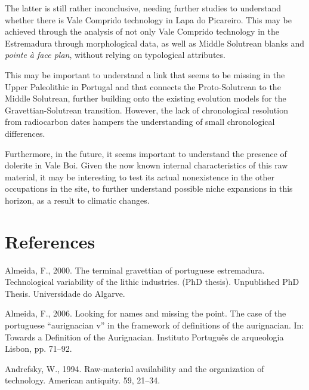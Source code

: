\documentclass[12pt,twoside]{reedthesis}
\begin{document}
The latter is still rather inconclusive, needing further studies to understand whether there is Vale Comprido technology in Lapa do Picareiro. This may be achieved through the analysis of not only Vale Comprido technology in the Estremadura through morphological data, as well as Middle Solutrean blanks and \emph{pointe à face plan}, without relying on typological attributes.

This may be important to understand a link that seems to be missing in the Upper Paleolithic in Portugal and that connects the Proto-Solutrean to the Middle Solutrean, further building onto the existing evolution models for the Gravettian-Solutrean transition. However, the lack of chronological resolution from radiocarbon dates hampers the understanding of small chronological differences.

Furthermore, in the future, it seems important to understand the presence of dolerite in Vale Boi. Given the now known internal characteristics of this raw material, it may be interesting to test its actual nonexistence in the other occupations in the site, to further understand possible niche expansions in this horizon, as a result to climatic changes.

\hypertarget{references}{%
\chapter*{References}\label{references}}


\noindent
\singlespacing

\setlength{\parindent}{-0.20in}
\setlength{\leftskip}{0.20in}
\setlength{\parskip}{8pt}

\hypertarget{refs}{}
\leavevmode\hypertarget{ref-almeida2000}{}%
Almeida, F., 2000. The terminal gravettian of portuguese estremadura. Technological variability of the lithic industries. (PhD thesis). Unpublished PhD Thesis. Universidade do Algarve.

\leavevmode\hypertarget{ref-almeida2006}{}%
Almeida, F., 2006. Looking for names and missing the point. The case of the portuguese ``aurignacian v'' in the framework of definitions of the aurignacian. In: Towards a Definition of the Aurignacian. Instituto Português de arqueologia Lisbon, pp. 71--92.

\leavevmode\hypertarget{ref-andrefsky1994}{}%
Andrefsky, W., 1994. Raw-material availability and the organization of technology. American antiquity. 59, 21--34.
\end{document}
